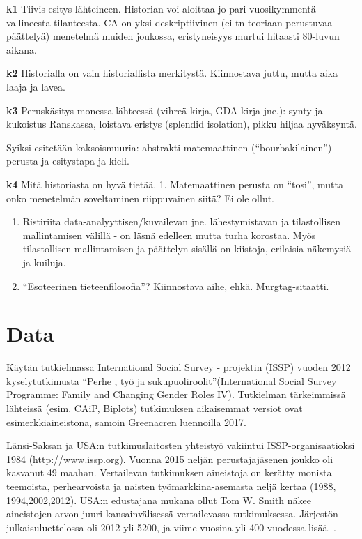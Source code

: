 \documentclass[
  finnish,
]{book}
\begin{document}
\textbf{k1} Tiivis esitys lähteineen. Historian voi aloittaa jo pari vuosikymmentä
vallineesta tilanteesta. CA on yksi deskriptiivinen (ei-tn-teoriaan perustuvaa
päättelyä) menetelmä muiden joukossa, eristyneisyys murtui hitaasti 80-luvun aikana.

\textbf{k2} Historialla on vain historiallista merkitystä. Kiinnostava juttu, mutta
aika laaja ja lavea.

\textbf{k3} Peruskäsitys monessa lähteessä (vihreä kirja, GDA-kirja jne.): synty ja
kukoistus Ranskassa, loistava eristys (splendid isolation), pikku hiljaa hyväksyntä.

Syiksi esitetään kaksoismuuria: abstrakti matemaattinen (``bourbakilainen'') perusta
ja esitystapa ja kieli.

\textbf{k4} Mitä historiasta on hyvä tietää.
1. Matemaattinen perusta on ``tosi'', mutta onko menetelmän soveltaminen riippuvainen
siitä? Ei ole ollut.

\begin{enumerate}
\def\labelenumi{\arabic{enumi}.}
\setcounter{enumi}{1}
\item
  Ristiriita data-analyyttisen/kuvailevan jne. lähestymistavan ja tilastollisen
  mallintamisen välillä - on läsnä edelleen mutta turha korostaa. Myös tilastollisen
  mallintamisen ja päättelyn sisällä on kiistoja, erilaisia näkemysiä ja kuiluja.
\item
  ``Esoteerinen tieteenfilosofia''? Kiinnostava aihe, ehkä. Murgtag-sitaatti.
\end{enumerate}

\hypertarget{data}{%
\chapter{Data}\label{data}}

Käytän tutkielmassa International Social Survey - projektin (ISSP) vuoden 2012
kyselytutkimusta ``Perhe , työ ja sukupuoliroolit''(International Social Survey
Programme: Family and Changing Gender Roles IV). Tutkielman tärkeimmissä lähteissä
(esim. CAiP, Biplots) tutkimuksen aikaisemmat versiot ovat esimerkkiaineistona,
samoin Greenacren luennoilla 2017.

Länsi-Saksan ja USA:n tutkimuslaitosten yhteistyö vakiintui ISSP-organisaatioksi
1984 (\url{http://www.issp.org}). Vuonna 2015 neljän perustajajäsenen joukko oli kasvanut 49 maahan.
Vertailevan tutkimuksen aineistoja on kerätty monista teemoista, perhearvoista
ja naisten työmarkkina-asemasta neljä kertaa (1988, 1994,2002,2012).
USA:n edustajana mukana ollut Tom W. Smith näkee aineistojen arvon juuri
kansainvälisessä vertailevassa tutkimuksessa. Järjestön julkaisuluettelossa oli
2012 yli 5200, ja viime vuosina yli 400 vuodessa lisää.
\citep{RefWorks:doc:5c0543a5e4b077eba1dc3cd8}.
\end{document}
